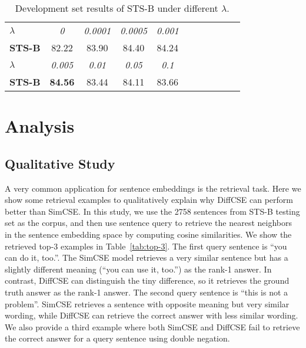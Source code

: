 \documentclass[11pt]{article}
\begin{document}
\begin{table}[t]
    \begin{center}
    \centering
    \small
    \begin{tabular}{lcccccccccc}
    \toprule
        \bf $\lambda$ & \it 0 & \it 0.0001 & \it 0.0005 & \it 0.001  \\ 
        \bf STS-B & 82.22 & 83.90 & 84.40 & 84.24  \\
    \midrule
        \bf $\lambda$ & \it 0.005 & \it 0.01 & \it 0.05 & \it 0.1 \\
        \bf STS-B & \bf 84.56 & 83.44 & 84.11 & 83.66 \\
    \bottomrule
    \end{tabular}
    \end{center}
    \vspace{-3mm}
    \caption{
        Development set results of STS-B under different $\lambda$.
    }
    \label{tab:lambda}
    \vspace{-1mm}
\end{table}


\section{Analysis}
\subsection{Qualitative Study}
A very common application for sentence embeddings is the retrieval task. Here we show some retrieval examples to qualitatively explain why DiffCSE can perform better than SimCSE. In this study, we use the 2758 sentences from STS-B testing set as the corpus, and then use sentence query to retrieve the nearest neighbors in the sentence embedding space by computing cosine similarities. We show the retrieved top-3 examples in Table~\ref{tab:top-3}. The first query sentence is ``you can do it, too.''. The SimCSE model retrieves a very similar sentence but has a slightly different meaning (``you can use it, too.'') as the rank-1 answer. In contrast, DiffCSE can distinguish the tiny difference, so it retrieves the ground truth answer as the rank-1 answer. The second query sentence is ``this is not a problem''. SimCSE retrieves a sentence with opposite meaning but very similar wording, while DiffCSE can retrieve the correct answer with less similar wording.
We also provide a third example where both SimCSE and DiffCSE fail to retrieve the correct answer for a query sentence using double negation.
\end{document}
